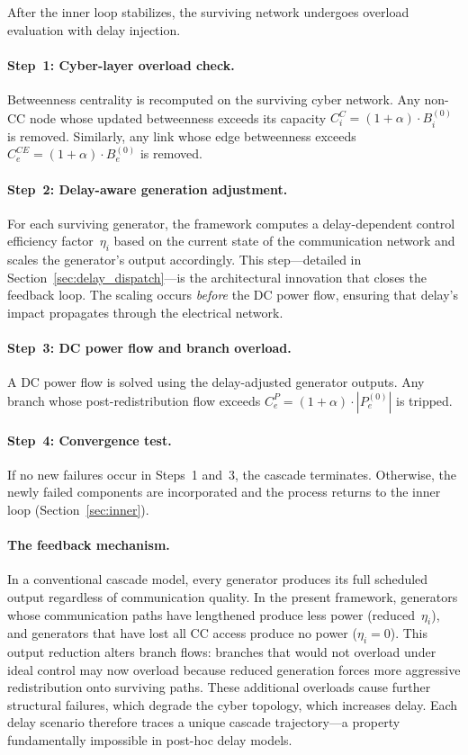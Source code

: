 \documentclass[a4paper,fleqn]{cas-dc}
\begin{document}
After the inner loop stabilizes, the surviving network undergoes
overload evaluation with delay injection.

\paragraph{Step~1: Cyber-layer overload check.}
Betweenness centrality is recomputed on the surviving cyber network.
Any non-CC node whose updated betweenness exceeds its capacity
$C_i^C=(1+\alpha)\cdot B_i^{(0)}$ is removed.  Similarly, any link
whose edge betweenness exceeds $C_e^{CE}=(1+\alpha)\cdot B_e^{(0)}$ is
removed.

\paragraph{Step~2: Delay-aware generation adjustment.}
For each surviving generator, the framework computes a delay-dependent
control efficiency factor~$\eta_i$ based on the current state of the
communication network and scales the generator's output accordingly.
This step---detailed in Section~\ref{sec:delay_dispatch}---is the
architectural innovation that closes the feedback loop.  The scaling
occurs \emph{before} the DC power flow, ensuring that delay's impact
propagates through the electrical network.

\paragraph{Step~3: DC power flow and branch overload.}
A DC power flow is solved using the delay-adjusted generator outputs.
Any branch whose post-redistribution flow exceeds
$C_e^P=(1+\alpha)\cdot|P_e^{(0)}|$ is tripped.

\paragraph{Step~4: Convergence test.}
If no new failures occur in Steps~1 and~3, the cascade terminates.
Otherwise, the newly failed components are incorporated and the process
returns to the inner loop (Section~\ref{sec:inner}).

\paragraph{The feedback mechanism.}
In a conventional cascade model, every generator produces its full
scheduled output regardless of communication quality.  In the present
framework, generators whose communication paths have lengthened produce
less power (reduced~$\eta_i$), and generators that have lost all CC
access produce no power ($\eta_i=0$).  This output reduction alters
branch flows: branches that would not overload under ideal control may
now overload because reduced generation forces more aggressive
redistribution onto surviving paths.  These additional overloads cause
further structural failures, which degrade the cyber topology, which
increases delay.  Each delay scenario therefore traces a unique cascade
trajectory---a property fundamentally impossible in post-hoc delay
models.
\end{document}

